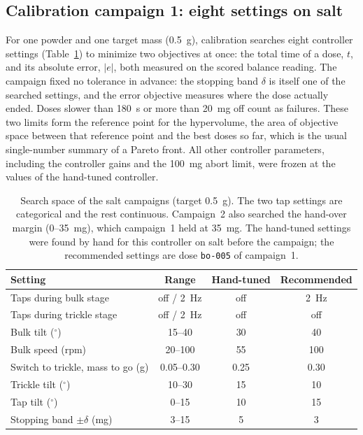 \documentclass[preprint,12pt]{elsarticle}
\begin{document}
\subsection{Calibration campaign 1: eight settings on salt}
\label{sec:bo}

For one powder and one target mass (0.5~g), calibration searches eight controller settings (Table~\ref{tab:space}) to minimize two objectives at once: the total time of a dose, $t$, and its absolute error, $|e|$, both measured on the scored balance reading. The campaign fixed no tolerance in advance: the stopping band $\delta$ is itself one of the searched settings, and the error objective measures where the dose actually ended. Doses slower than 180~s or more than 20~mg off count as failures. These two limits form the reference point for the hypervolume, the area of objective space between that reference point and the best doses so far, which is the usual single-number summary of a Pareto front. All other controller parameters, including the controller gains and the 100~mg abort limit, were frozen at the values of the hand-tuned controller.

\begin{table}[t]
\centering
\caption{Search space of the salt campaigns (target 0.5~g). The two tap settings are categorical and the rest continuous. Campaign~2 also searched the hand-over margin (0--35~mg), which campaign~1 held at 35~mg. The hand-tuned settings were found by hand for this controller on salt before the campaign; the recommended settings are dose \texttt{bo-005} of campaign~1.}
\label{tab:space}
\small
\begin{tabularx}{\linewidth}{@{}Xccc@{}}
\toprule
Setting & Range & Hand-tuned & Recommended \\
\midrule
Taps during bulk stage & off / 2~Hz & off & 2~Hz \\
Taps during trickle stage & off / 2~Hz & off & off \\
Bulk tilt ($^\circ$) & 15--40 & 30 & 40 \\
Bulk speed (rpm) & 20--100 & 55 & 100 \\
Switch to trickle, mass to go (g) & 0.05--0.30 & 0.25 & 0.30 \\
Trickle tilt ($^\circ$) & 10--30 & 15 & 10 \\
Tap tilt ($^\circ$) & 0--15 & 10 & 15 \\
Stopping band $\pm\delta$ (mg) & 3--15 & 5 & 3 \\
\bottomrule
\end{tabularx}
\end{table}
\end{document}
